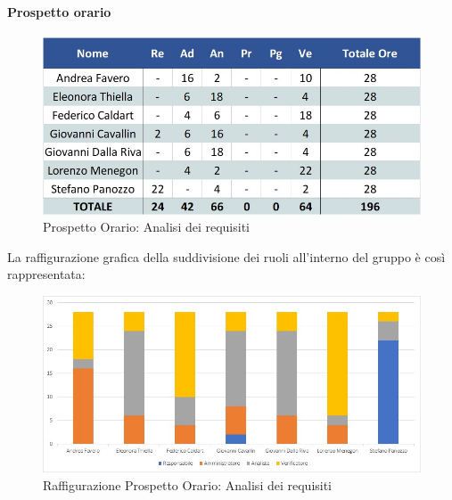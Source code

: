 \paragraph{Prospetto orario}
\begin{figure}[h!]
	\centerline{\includegraphics[scale=0.4]{img/Preventivo/AnalisiRequisitiOrario.jpg}}
	\caption{Prospetto Orario: Analisi dei requisiti}
\end{figure}
La raffigurazione grafica della suddivisione dei ruoli all'interno del gruppo è così rappresentata: 
\begin{figure}[h!]
	\centerline{\includegraphics[scale=0.4]{img/Preventivo/Istogrammi/AnalisiRequisiti.jpg}}
	\caption{Raffigurazione Prospetto Orario: Analisi dei requisiti}
\end{figure}
